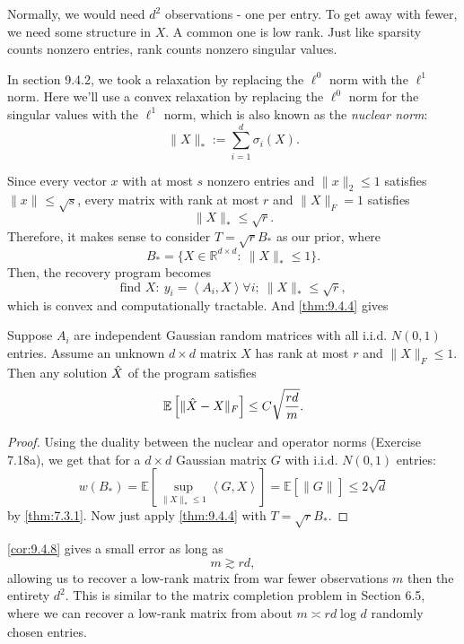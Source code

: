 Normally, we would need $d^2$ observations - one per entry. To get away with fewer, we need some structure in 
$X$. A common one is low rank. Just like sparsity counts nonzero entries, rank counts nonzero singular values.

In section 9.4.2, we took a relaxation by replacing the $\ell^0$ norm with the $\ell^1$ norm. Here we'll use 
a convex relaxation by replacing the $\ell^0$ norm for the singular values with the $\ell^1$ norm, which 
is also known as the \textit{nuclear norm}:
\[ \lVert X \rVert_{*} := \sum_{i = 1}^{d} \sigma_i(X). \]

Since every vector $x$ with at most $s$ nonzero entries and $\lVert x \rVert_{2} \leq 1$ satisfies 
$\lVert x \rVert_{} \leq \sqrt{s}$, every matrix with rank at most $r$ and $\lVert X \rVert_{F} = 1$ satisfies 
\[ \lVert X \rVert_{*} \leq \sqrt{r}. \]
Therefore, it makes sense to consider $T = \sqrt{r}B_*$ as our prior, where 
\[ B_* = \{ X \in \mathbb{R}^{d \times d}: \ \lVert X \rVert_{*} \leq 1 \}. \]
Then, the recovery program becomes 
\[ \text{find } X: \ y_i = \left\langle A_i, X \right\rangle \forall i; \ \lVert X \rVert_{*} \leq \sqrt{r}, \]
which is convex and computationally tractable. And \cref{thm:9.4.4} gives 

\begin{corollary}
\label{cor:9.4.11}
Suppose $A_i$ are independent Gaussian random matrices with all i.i.d. $N(0, 1)$ entries. Assume an unknown 
$d \times d$ matrix $X$ has rank at most $r$ and $\lVert X \rVert_{F} \leq 1$. Then any solution $\Hat{X}$ of 
the program satisfies 
\[ \mathbb{E}\left[ \lVert \Hat{X} - X \rVert_{F} \right] \leq C \sqrt{\frac{rd}{m}}. \]
\end{corollary}

\begin{proof}
Using the duality between the nuclear and operator norms (Exercise 7.18a), we get that for a $d \times d$ 
Gaussian matrix $G$ with i.i.d. $N(0, 1)$ entries:
\[ w(B_*) = \mathbb{E}\left[ \sup_{\lVert X \rVert_{*} \leq 1} \left\langle G, X \right\rangle \right] 
= \mathbb{E}\left[ \lVert G \rVert_{} \right] \leq 2 \sqrt{d} \]
by \cref{thm:7.3.1}. Now just apply \cref{thm:9.4.4} with $T = \sqrt{r}B_*$. 
\end{proof}

\begin{remark}
\label{rmk:9.4.12}
\cref{cor:9.4.8} gives a small error as long as
\[ m \gtrsim rd, \]
allowing us to recover a low-rank matrix from war fewer observations $m$ then the entirety $d^2$. This is 
similar to the matrix completion problem in Section 6.5, where we can recover a low-rank matrix from about 
$m \asymp rd \log_{}{d}$ randomly chosen entries.
\end{remark}



